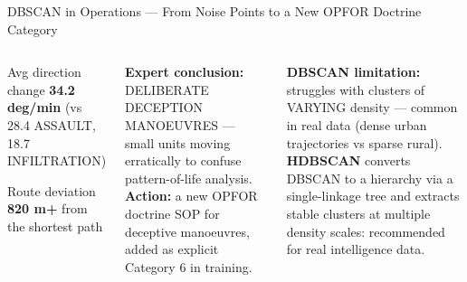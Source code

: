 \documentclass[aspectratio=169,10pt,t]{beamer}
\begin{document}
\begin{frame}{DBSCAN in Operations --- From Noise Points to a New OPFOR Doctrine Category}
\begin{columns}[T]
\begin{tl}\item Avg direction change \textbf{34.2 deg/min} (vs 28.4 ASSAULT, 18.7 INFILTRATION)\item Route deviation \textbf{820 m+} from the shortest path\end{tl}
\begin{rbox}\scriptsize\textbf{Expert conclusion:} DELIBERATE DECEPTION MANOEUVRES --- small units moving erratically to confuse pattern-of-life analysis. \textbf{Action:} a new OPFOR doctrine SOP for deceptive manoeuvres, added as explicit Category 6 in training.\end{rbox}
\begin{wbox}\scriptsize\textbf{DBSCAN limitation:} struggles with clusters of VARYING density --- common in real data (dense urban trajectories vs sparse rural). \textbf{HDBSCAN} converts DBSCAN to a hierarchy via a single-linkage tree and extracts stable clusters at multiple density scales: recommended for real intelligence data.\end{wbox}
\end{columns}
\end{frame}
\end{document}
